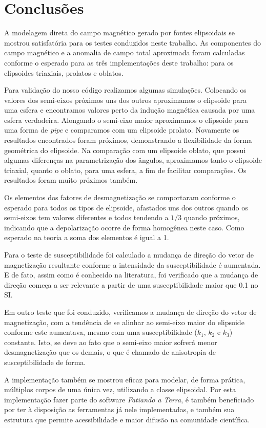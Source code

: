 \chapter{Conclusões}

A modelagem direta do campo magnético gerado por fontes elipsoidais se mostrou satisfatória para os testes conduzidos neste trabalho. As componentes do campo magnético e a anomalia de campo total aproximada foram calculadas conforme o esperado para as três implementações deste trabalho: para os elipsoides triaxiais, prolatos e oblatos.

Para validação do nosso código realizamos algumas simulações. Colocando os valores dos semi-eixos próximos uns dos outros aproximamos o elipsoide para uma esfera e encontramos valores perto da indução magnética causada por uma esfera verdadeira.
Alongando o semi-eixo maior aproximamos o elipsoide para uma forma de \textit{pipe} e comparamos com um elipsoide prolato. Novamente os resultados encontrados foram próximos, demonstrando a flexibilidade da forma geométrica do elipsoide. 
Na comparação com um elipsoide oblato, que possui algumas diferenças na parametrização dos ângulos, aproximamos tanto o elipsoide triaxial, quanto o oblato, para uma esfera, a fim de facilitar comparações. Os resultados foram muito próximos também.

Os elementos dos fatores de desmagnetização se comportaram conforme o esperado para todos os tipos de elipsoide, afastados uns dos outros quando os semi-eixos tem valores diferentes e todos tendendo a $1/3$ quando próximos, indicando que a depolarização ocorre de forma homogênea neste caso. Como esperado na teoria a soma dos elementos é igual a 1.

Para o teste de susceptibilidade foi calculado a mudança de direção do vetor de magnetização resultante conforme a intensidade da susceptibilidade é aumentada. E de fato, assim como é conhecido na literatura, foi verificado que a mudança de direção começa a ser relevante a partir de uma susceptibilidade maior que 0.1 no SI.

Em outro teste que foi conduzido, verificamos a mudança de direção do vetor de magnetização, com a tendência de se alinhar ao semi-eixo maior do elipsoide conforme este aumentava, mesmo com uma susceptibilidade ($k_1$, $k_2$ e $k_3$) constante. Isto, se deve ao fato que o semi-eixo maior sofrerá menor desmagnetização que os demais, o que é chamado de anisotropia de susceptibilidade de forma.

A implementação também se mostrou eficaz para modelar, de forma prática, múltiplos corpos de uma única vez, utilizando a classe elipsoidal. Por esta implementação fazer parte do software \textit{Fatiando a Terra}, é também beneficiado por ter à disposição as ferramentas já nele implementadas, e também sua estrutura que permite acessibilidade e maior difusão na comunidade científica. 

